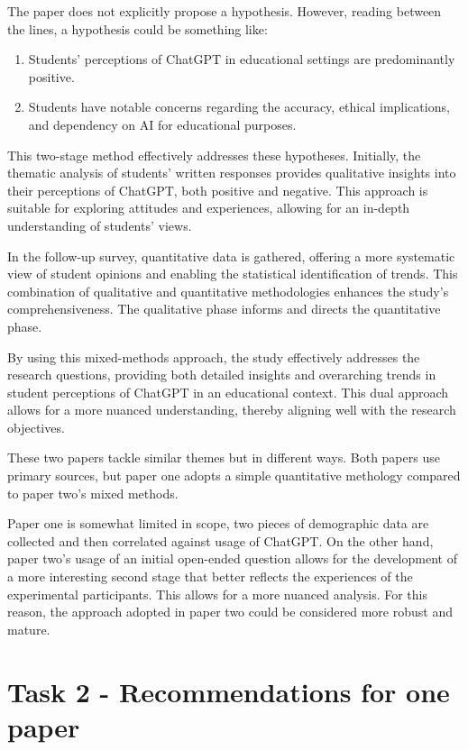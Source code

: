 \documentclass[12pt]{article}
\begin{document}
The paper does not explicitly propose a hypothesis. However, reading between the lines, a hypothesis could be something like:

\begin{enumerate}
    \item Students' perceptions of ChatGPT in educational settings are predominantly positive.
    \item Students have notable concerns regarding the accuracy, ethical implications, and dependency on AI for educational purposes.
\end{enumerate}

This two-stage method effectively addresses these hypotheses. Initially, the thematic analysis of students' written responses provides qualitative insights into their perceptions of ChatGPT, both positive and negative. This approach is suitable for exploring attitudes and experiences, allowing for an in-depth understanding of students' views. \cite{mertens}

In the follow-up survey, quantitative data is gathered, offering a more systematic view of student opinions and enabling the statistical identification of trends. This combination of qualitative and quantitative methodologies enhances the study's comprehensiveness. The qualitative phase informs and directs the quantitative phase. \cite{merriam}

By using this mixed-methods approach, the study effectively addresses the research questions, providing both detailed insights and overarching trends in student perceptions of ChatGPT in an educational context. This dual approach allows for a more nuanced understanding, thereby aligning well with the research objectives.

These two papers tackle similar themes but in different ways. Both papers use primary sources, but paper one adopts a simple quantitative methology compared to paper two's mixed methods.

Paper one is somewhat limited in scope, two pieces of demographic data are collected and then correlated against usage of ChatGPT. On the other hand, paper two's usage of an initial open-ended question allows for the development of a more interesting second stage that better reflects the experiences of the experimental participants. This allows for a more nuanced analysis. For this reason, the approach adopted in paper two could be considered more robust and mature.



\section{Task 2 - Recommendations for one paper}
\end{document}
